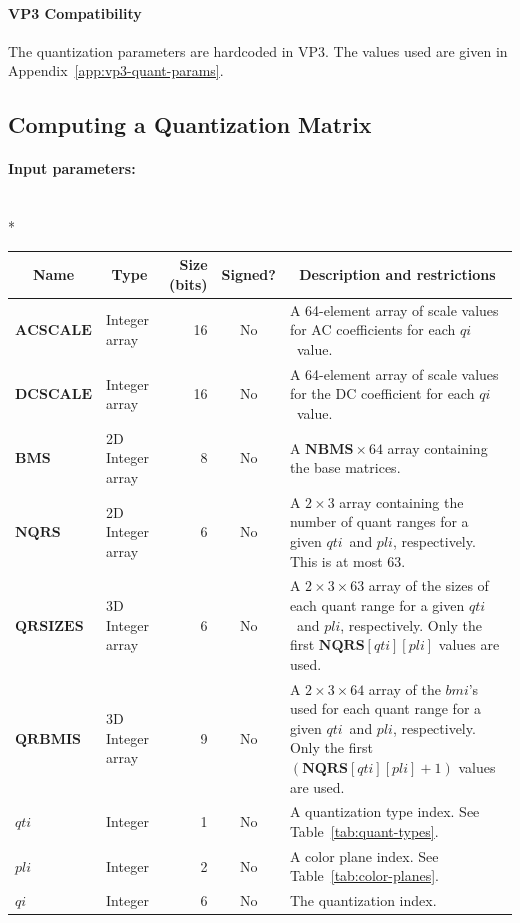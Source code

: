\documentclass[9pt,letterpaper]{book}
\newcommand{\idx}[1]{{\ensuremath{\mathit{#1}}}}
\newcommand{\qti}{\idx{qti}}
\newcommand{\pli}{\idx{pli}}
\newcommand{\qi}{\idx{qi}}
\newcommand{\bmi}{\idx{bmi}}
\newcommand{\bitvar}[1]{\ensuremath{\mathbf{\bm{#1}}}}
\numberwithin{equation}{chapter}
\numberwithin{figure}{chapter}
\numberwithin{table}{chapter}
\begin{document}
\paragraph{VP3 Compatibility}

The quantization parameters are hardcoded in VP3.
The values used are given in Appendix~\ref{app:vp3-quant-params}.

\subsection{Computing a Quantization Matrix}
\label{sub:quant-mat}

\paragraph{Input parameters:}\hfill\\*
\begin{tabularx}{\textwidth}{@{}llrcX@{}}\toprule
\multicolumn{1}{c}{Name} &
\multicolumn{1}{c}{Type} &
\multicolumn{1}{p{30pt}}{\centering Size (bits)} &
\multicolumn{1}{c}{Signed?} &
\multicolumn{1}{c}{Description and restrictions} \\\midrule\endhead
\bitvar{ACSCALE} & \multicolumn{1}{p{40pt}}{Integer array} &
                             16 & No & A 64-element array of scale values for
 AC coefficients for each \qi\ value. \\
\bitvar{DCSCALE} & \multicolumn{1}{p{40pt}}{Integer array} &
                             16 & No & A 64-element array of scale values for
 the DC coefficient for each \qi\ value. \\
\bitvar{BMS}     & \multicolumn{1}{p{50pt}}{2D Integer array} &
                              8 & No & A $\bitvar{NBMS}\times 64$ array
 containing the base matrices. \\
\bitvar{NQRS}    & \multicolumn{1}{p{50pt}}{2D Integer array} &
                              6 & No & A $2\times 3$ array containing the
 number of quant ranges for a given \qti\ and \pli, respectively.
This is at most $63$. \\
\bitvar{QRSIZES} & \multicolumn{1}{p{50pt}}{3D Integer array} &
                              6 & No & A $2\times 3\times 63$ array of the
 sizes of each quant range for a given \qti\ and \pli, respectively.
Only the first $\bitvar{NQRS}[\qti][\pli]$ values are used. \\
\bitvar{QRBMIS}  & \multicolumn{1}{p{50pt}}{3D Integer array} &
                              9 & No & A $2\times 3\times 64$ array of the
 \bmi's used for each quant range for a given \qti\ and \pli, respectively.
Only the first $(\bitvar{NQRS}[\qti][\pli]+1)$ values are used. \\
\bitvar{\qti}    & Integer &  1 & No & A quantization type index.
See Table~\ref{tab:quant-types}.\\
\bitvar{\pli}    & Integer &  2 & No & A color plane index.
See Table~\ref{tab:color-planes}.\\
\bitvar{\qi}     & Integer &  6 & No & The quantization index. \\
\bottomrule\end{tabularx}
\end{document}
